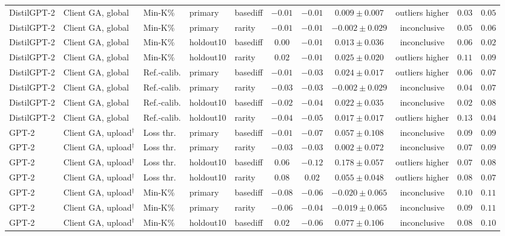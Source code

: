 \begin{table}[t]
\begin{tabular*}{\textwidth}{@{\extracolsep{\fill}}lllllcccccc@{}}
DistilGPT-2 & Client GA, global & Min-K\% & primary & basediff & $-0.01$ & $-0.01$ & $0.009 \pm 0.007$ & outliers higher & $0.03$ & $0.05$ \\
DistilGPT-2 & Client GA, global & Min-K\% & primary & rarity & $-0.01$ & $-0.01$ & $-0.002 \pm 0.029$ & inconclusive & $0.05$ & $0.06$ \\
DistilGPT-2 & Client GA, global & Min-K\% & holdout10 & basediff & $0.00$ & $-0.01$ & $0.013 \pm 0.036$ & inconclusive & $0.06$ & $0.02$ \\
DistilGPT-2 & Client GA, global & Min-K\% & holdout10 & rarity & $0.02$ & $-0.01$ & $0.025 \pm 0.020$ & outliers higher & $0.11$ & $0.09$ \\
DistilGPT-2 & Client GA, global & Ref.-calib. & primary & basediff & $-0.01$ & $-0.03$ & $0.024 \pm 0.017$ & outliers higher & $0.06$ & $0.07$ \\
DistilGPT-2 & Client GA, global & Ref.-calib. & primary & rarity & $-0.03$ & $-0.03$ & $-0.002 \pm 0.029$ & inconclusive & $0.04$ & $0.07$ \\
DistilGPT-2 & Client GA, global & Ref.-calib. & holdout10 & basediff & $-0.02$ & $-0.04$ & $0.022 \pm 0.035$ & inconclusive & $0.02$ & $0.08$ \\
DistilGPT-2 & Client GA, global & Ref.-calib. & holdout10 & rarity & $-0.04$ & $-0.05$ & $0.017 \pm 0.017$ & outliers higher & $0.13$ & $0.04$ \\
GPT-2 & Client GA, upload$^{\dagger}$ & Loss thr. & primary & basediff & $-0.01$ & $-0.07$ & $0.057 \pm 0.108$ & inconclusive & $0.09$ & $0.09$ \\
GPT-2 & Client GA, upload$^{\dagger}$ & Loss thr. & primary & rarity & $-0.03$ & $-0.03$ & $0.002 \pm 0.072$ & inconclusive & $0.07$ & $0.09$ \\
GPT-2 & Client GA, upload$^{\dagger}$ & Loss thr. & holdout10 & basediff & $0.06$ & $-0.12$ & $0.178 \pm 0.057$ & outliers higher & $0.07$ & $0.08$ \\
GPT-2 & Client GA, upload$^{\dagger}$ & Loss thr. & holdout10 & rarity & $0.08$ & $0.02$ & $0.055 \pm 0.048$ & outliers higher & $0.08$ & $0.07$ \\
GPT-2 & Client GA, upload$^{\dagger}$ & Min-K\% & primary & basediff & $-0.08$ & $-0.06$ & $-0.020 \pm 0.065$ & inconclusive & $0.10$ & $0.11$ \\
GPT-2 & Client GA, upload$^{\dagger}$ & Min-K\% & primary & rarity & $-0.06$ & $-0.04$ & $-0.019 \pm 0.065$ & inconclusive & $0.09$ & $0.11$ \\
GPT-2 & Client GA, upload$^{\dagger}$ & Min-K\% & holdout10 & basediff & $0.02$ & $-0.06$ & $0.077 \pm 0.106$ & inconclusive & $0.08$ & $0.10$ \\

\end{tabular*}
\end{table}
